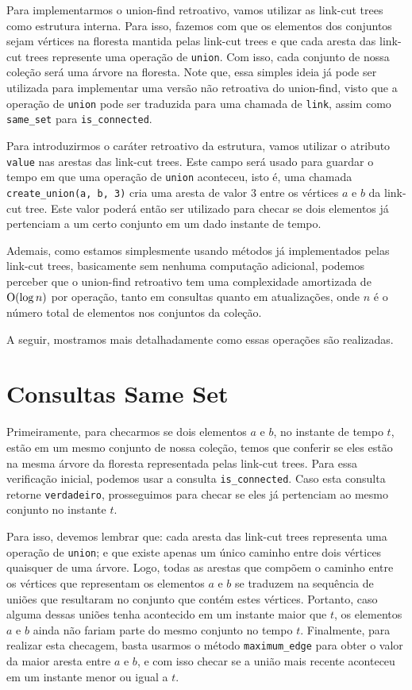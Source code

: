 Para implementarmos o union-find retroativo, vamos utilizar as link-cut trees como estrutura interna. Para isso, fazemos com que os elementos dos conjuntos sejam vértices na floresta mantida pelas link-cut trees e que cada aresta das link-cut trees represente uma operação de \texttt{union}. Com isso, cada conjunto de nossa coleção será uma árvore na floresta. Note que, essa simples ideia já pode ser utilizada para implementar uma versão não retroativa do union-find, visto que a operação de \texttt{union} pode ser traduzida para uma chamada de \texttt{link}, assim como \texttt{same\_set} para \texttt{is\_connected}.

Para introduzirmos o caráter retroativo da estrutura, vamos utilizar o atributo \texttt{value} nas arestas das link-cut trees. Este campo será usado para guardar o tempo em que uma operação de \texttt{union} aconteceu, isto é, uma chamada \texttt{create\_union(a, b, 3)} cria uma aresta de valor $3$ entre os vértices $a$ e $b$ da link-cut tree. Este valor poderá então ser utilizado para checar se dois elementos já pertenciam a um certo conjunto em um dado instante de tempo.

Ademais, como estamos simplesmente usando métodos já implementados pelas link-cut trees, basicamente sem nenhuma computação adicional, podemos perceber que o union-find retroativo tem uma complexidade amortizada de $\mathrm{O}(\log n)$ por operação, tanto em consultas quanto em atualizações, onde $n$ é o número total de elementos nos conjuntos da coleção.

A seguir, mostramos mais detalhadamente como essas operações são realizadas.

\section{Consultas Same Set}
\label{sec:uf-same-set}

Primeiramente, para checarmos se dois elementos $a$ e $b$, no instante de tempo $t$, estão em um mesmo conjunto de nossa coleção, temos que conferir se eles estão na mesma árvore da floresta representada pelas link-cut trees. Para essa verificação inicial, podemos usar a consulta \texttt{is\_connected}. Caso esta consulta retorne \texttt{verdadeiro}, prosseguimos para checar se eles já pertenciam ao mesmo conjunto no instante $t$.

Para isso, devemos lembrar que: cada aresta das link-cut trees representa uma operação de \texttt{union}; e que existe apenas um único caminho entre dois vértices quaisquer de uma árvore. Logo, todas as arestas que compõem o caminho entre os vértices que representam os elementos $a$ e $b$ se traduzem na sequência de uniões que resultaram no conjunto que contém estes vértices. Portanto, caso alguma dessas uniões tenha acontecido em um instante maior que $t$, os elementos $a$ e $b$ ainda não fariam parte do mesmo conjunto no tempo $t$. Finalmente, para realizar esta checagem, basta usarmos o método \texttt{maximum\_edge} para obter o valor da maior aresta entre $a$ e $b$, e com isso checar se a união mais recente aconteceu em um instante menor ou igual a $t$.

